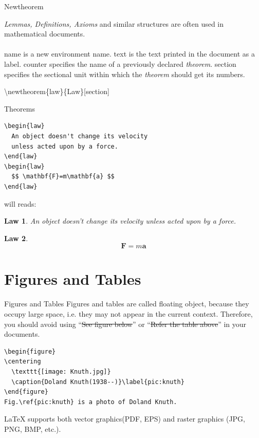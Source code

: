 \documentclass[10pt]{beamer}
\begin{document}
\begin{frame}[t]{Newtheorem}

{\em Lemmas, Definitions, Axioms} and similar structures are often used
    in mathematical documents.\\[3ex]

    \\[3ex]

\alert{name} is a new environment name. \alert{text} is the text
printed in the document as a label. \alert{counter} specifies the
name of a previously declared {\em theorem}. \alert{section} specifies
the sectional unit within which the {\em theorem} should get its numbers.

    \begin{example}
        \textbackslash newtheorem\{law\}\{Law\}[section]
    \end{example}

\end{frame}

\begin{frame}[fragile]{Theorems}
\newtheorem{law}{Law}[section]
\begin{verbatim}
\begin{law}
  An object doesn't change its velocity
  unless acted upon by a force.
\end{law}
\begin{law}
  $$ \mathbf{F}=m\mathbf{a} $$
\end{law}
\end{verbatim}

will reads:

\begin{law}
  An object doesn't change its velocity unless acted upon by a force.
\end{law}
\begin{law}
  $$ \mathbf{F}=m\mathbf{a} $$
\end{law}

\end{frame}

\section{Figures and Tables}
\begin{frame}[fragile]{Figures and Tables}
    Figures and tables are called \alert{floating object}, because
    they occupy large space, i.e. they may not appear in the current
    context. Therefore, you should avoid using ``\sout{See figure below}''
    or ``\sout{Refer the table above}'' in your documents.

\begin{verbatim}
\begin{figure}
\centering
  \texttt{[image: Knuth.jpg]}
  \caption{Doland Knuth(1938--)}\label{pic:knuth}
\end{figure}
Fig.\ref{pic:knuth} is a photo of Doland Knuth.
\end{verbatim}

    \LaTeX{} supports both vector graphics(PDF, EPS) and raster graphics
    (JPG, PNG, BMP, etc.).

\end{frame}
\end{document}
